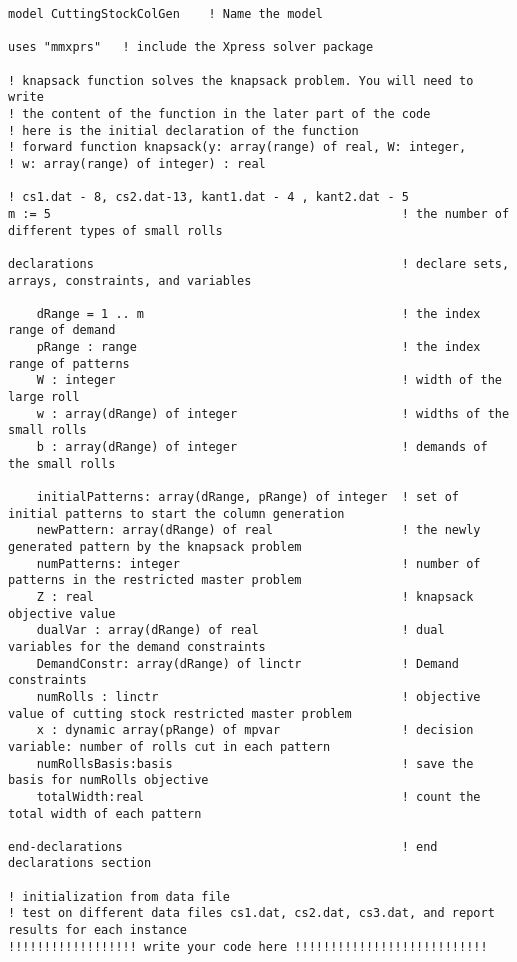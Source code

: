 \documentclass[twoside,12pt]{article}
\begin{document}
\begin{verbatim}
model CuttingStockColGen	! Name the model

uses "mmxprs"	! include the Xpress solver package

! knapsack function solves the knapsack problem. You will need to write 
! the content of the function in the later part of the code
! here is the initial declaration of the function
! forward function knapsack(y: array(range) of real, W: integer,
! w: array(range) of integer) : real

! cs1.dat - 8, cs2.dat-13, kant1.dat - 4 , kant2.dat - 5
m := 5                                                 ! the number of different types of small rolls 

declarations										   ! declare sets, arrays, constraints, and variables
	
	dRange = 1 .. m                                    ! the index range of demand
	pRange : range                                     ! the index range of patterns
	W : integer										   ! width of the large roll
	w : array(dRange) of integer                       ! widths of the small rolls
	b : array(dRange) of integer                  	   ! demands of the small rolls
		
	initialPatterns: array(dRange, pRange) of integer  ! set of initial patterns to start the column generation
	newPattern: array(dRange) of real                  ! the newly generated pattern by the knapsack problem
	numPatterns: integer                               ! number of patterns in the restricted master problem
	Z : real 			                               ! knapsack objective value
	dualVar : array(dRange) of real                    ! dual variables for the demand constraints
	DemandConstr: array(dRange) of linctr              ! Demand constraints
	numRolls : linctr	                               ! objective value of cutting stock restricted master problem		
	x : dynamic array(pRange) of mpvar                 ! decision variable: number of rolls cut in each pattern
	numRollsBasis:basis		                           ! save the basis for numRolls objective
	totalWidth:real                                    ! count the total width of each pattern
	
end-declarations									   ! end declarations section

! initialization from data file
! test on different data files cs1.dat, cs2.dat, cs3.dat, and report results for each instance
!!!!!!!!!!!!!!!!!! write your code here !!!!!!!!!!!!!!!!!!!!!!!!!!!


\end{verbatim}
\end{document}
